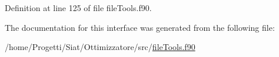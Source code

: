 Definition at line 125 of file file\-Tools.\-f90.



The documentation for this interface was generated from the following file\-:\begin{DoxyCompactItemize}
\item 
/home/\-Progetti/\-Siat/\-Ottimizzatore/src/\hyperlink{file_tools_8f90}{file\-Tools.\-f90}\end{DoxyCompactItemize}
